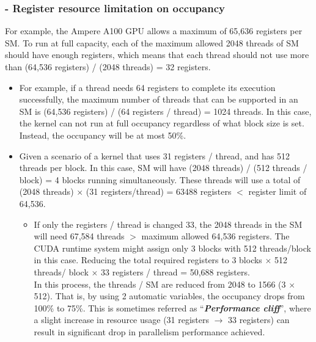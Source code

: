 \subsubsection{- Register resource limitation on occupancy}
For example, the Ampere A100 GPU allows a maximum of 65,636 registers per SM. To run at full capacity, each of the maximum allowed 2048 threads of SM should have enough registers, which means that each thread should not use more than (64,536 registers) / (2048 threads) = 32 registers.
\begin{itemize}
    \item For example, if a thread needs 64 registers to complete its execution successfully, the maximum number of threads that can be supported in an SM is (64,536 registers) / (64 registers / thread) = 1024 threads. In this case, the kernel can not run at full occupancy regardless of what block size is set. Instead, the occupancy will be at most 50\%.
    \item Given a scenario of a kernel that uses 31 registers / thread, and has 512 threads per block. In this case, SM will have (2048 threads) / (512 threads / block) = 4 blocks running simultaneously. These threads will use a total of (2048 threads) $\times$ (31 registers/thread) = 63488 registers $<$  register limit of 64,536.
          \begin{itemize}
              \item If only the registers / thread is changed 33, the 2048 threads in the SM will need 67,584 threads $>$ maximum allowed 64,536 registers. The CUDA runtime system might assign only 3 blocks with 512 threads/block in this case. Reducing the  total required registers to 3 blocks $\times$ 512 threads/ block $\times$ 33 registers / thread = 50,688 registers. \\ In this process, the threads / SM are reduced from 2048 to 1566 (3 $\times$ 512). That is, by using 2 automatic variables, the occupancy drops from 100\% to 75\%. This is sometimes referred as \enquote{\textbf{\textsl{Performance cliff}}}, where a slight increase in resource usage (31 registers $\rightarrow$ 33 registers) can result in significant drop in parallelism performance achieved.
          \end{itemize}
\end{itemize}

